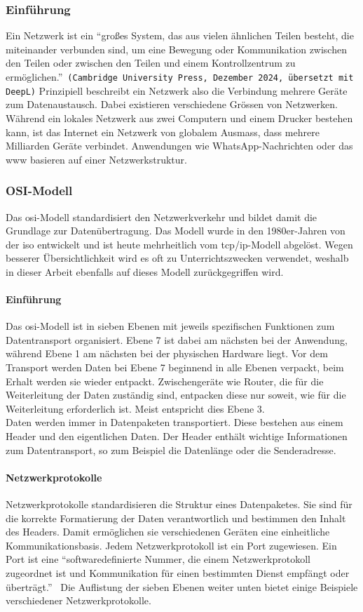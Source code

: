 \documentclass[11pt, a4paper]{article}
\begin{document}
\subsubsection{Einführung}
Ein Netzwerk ist ein ``großes System, das aus vielen ähnlichen Teilen besteht, die miteinander verbunden sind, um eine Bewegung oder Kommunikation zwischen den Teilen oder zwischen den Teilen und einem Kontrollzentrum zu ermöglichen.''~\texttt{(Cambridge University Press, Dezember 2024, übersetzt mit DeepL)} Prinzipiell beschreibt ein Netzwerk also die Verbindung mehrere Geräte zum Datenaustausch. Dabei existieren verschiedene Grössen von Netzwerken. Während ein lokales Netzwerk aus zwei Computern und einem Drucker bestehen kann, ist das Internet ein Netzwerk von globalem Ausmass, dass mehrere Milliarden Geräte verbindet. Anwendungen wie WhatsApp-Nachrichten oder das \gls{www} basieren auf einer Netzwerkstruktur.

\subsubsection{OSI-Modell}\label{subsubsec:osimodell}
Das \gls{osi}-Modell standardisiert den Netzwerkverkehr und bildet damit die Grundlage zur Datenübertragung. Das Modell wurde in den 1980er-Jahren von der \gls{iso} entwickelt und ist heute mehrheitlich vom \gls{tcp}/\gls{ip}-Modell abgelöst. Wegen besserer Übersichtlichkeit wird es oft zu Unterrichtszwecken verwendet, weshalb in dieser Arbeit ebenfalls auf dieses Modell zurückgegriffen wird.~\cite{OSImodelWikipedia:online}
\paragraph{Einführung}
Das \gls{osi}-Modell ist in sieben Ebenen mit jeweils spezifischen Funktionen zum Datentransport organisiert. Ebene 7 ist dabei am nächsten bei der Anwendung, während Ebene 1 am nächsten bei der physischen Hardware liegt. Vor dem Transport werden Daten bei Ebene 7 beginnend in alle Ebenen verpackt, beim Erhalt werden sie wieder entpackt. Zwischengeräte wie Router, die für die Weiterleitung der Daten zuständig sind, entpacken diese nur soweit, wie für die Weiterleitung erforderlich ist. Meist entspricht dies Ebene 3. \\Daten werden immer in Datenpaketen transportiert. Diese bestehen aus einem Header und den eigentlichen Daten. Der Header enthält wichtige Informationen zum Datentransport, so zum Beispiel die Datenlänge oder die Senderadresse. 
\paragraph{Netzwerkprotokolle}
Netzwerkprotokolle standardisieren die Struktur eines Datenpaketes. Sie sind für die korrekte Formatierung der Daten verantwortlich und bestimmen den Inhalt des Headers. Damit ermöglichen sie verschiedenen Geräten eine einheitliche Kommunikationsbasis. Jedem Netzwerkprotokoll ist ein Port zugewiesen. Ein Port ist eine ``softwaredefinierte Nummer, die einem Netzwerkprotokoll zugeordnet ist und Kommunikation für einen bestimmten Dienst empfängt oder überträgt.''~\cite{WasistPo:online} Die Auflistung der sieben Ebenen weiter unten bietet einige Beispiele verschiedener Netzwerkprotokolle.
\end{document}
